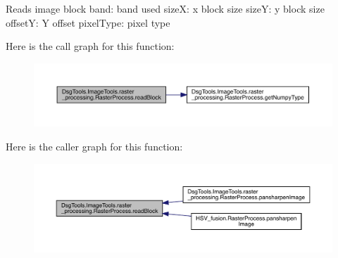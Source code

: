\begin{DoxyVerb}Reads image block
band: band used
sizeX: x block size
sizeY: y block size
offsetY: Y offset
pixelType: pixel type
\end{DoxyVerb}
 Here is the call graph for this function\+:
\nopagebreak
\begin{figure}[H]
\begin{center}
\leavevmode
\includegraphics[width=350pt]{class_dsg_tools_1_1_image_tools_1_1raster__processing_1_1_raster_process_a12d8f5cf2100deb19ccf59e86596648e_cgraph}
\end{center}
\end{figure}
Here is the caller graph for this function\+:
\nopagebreak
\begin{figure}[H]
\begin{center}
\leavevmode
\includegraphics[width=350pt]{class_dsg_tools_1_1_image_tools_1_1raster__processing_1_1_raster_process_a12d8f5cf2100deb19ccf59e86596648e_icgraph}
\end{center}
\end{figure}
\mbox{\label{class_dsg_tools_1_1_image_tools_1_1raster__processing_1_1_raster_process_abd1c9e282d7419d6f808986c26f7bdd2}} 
